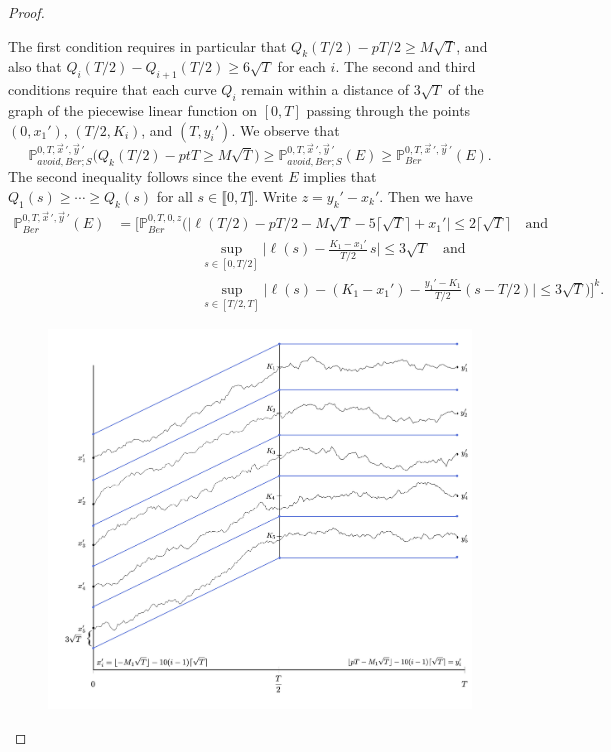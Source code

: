 \begin{proof}
\begin{enumerate}[label=(\arabic*)]
	\end{enumerate}
	The first condition requires in particular that $Q_k(T/2)-pT/2 \geq M\sqrt{T}$, and also that $Q_i(T/2)-Q_{i+1}(T/2)\geq 6\sqrt{T}$ for each $i$. The second and third conditions require that each curve $Q_i$ remain within a distance of $3\sqrt{T}$ of the graph of the piecewise linear function on $[0,T]$ passing through the points $(0,x_1')$, $(T/2,K_i)$, and $(T,y_i')$. We observe that
	\[
	\mathbb{P}^{0,T,\vec{x}\,',\vec{y}\,'}_{avoid, Ber; S} \Big(Q_k(T/2) - ptT \geq M\sqrt{T}\Big) \geq \mathbb{P}^{0,T,\vec{x}\,',\vec{y}\,'}_{avoid, Ber; S}(E) \geq \mathbb{P}^{0,T,\vec{x}\,',\vec{y}\,'}_{Ber}(E).
	\]
	The second inequality follows since the event $E$ implies that $Q_1(s)\geq\cdots\geq Q_k(s)$ for all $s\in\llbracket 0,T \rrbracket$. Write $z=y_k'-x_k'$. Then we have
	\begin{equation}\label{19gibbs}
	\begin{split}
	\mathbb{P}^{0,T,\vec{x}\,',\vec{y}\,'}_{Ber}(E) &= \Big[\mathbb{P}^{0,T,0,z}_{Ber}\Big(\big|\ell(T/2)-pT/2-M\sqrt{T}-5\lceil\sqrt{T}\rceil+x_1'\big|\leq 2\lceil\sqrt{T}\rceil \quad\mathrm{and}\\
	&\qquad\qquad\qquad \sup_{s\in[0,T/2]}\Big|\ell(s) - \frac{K_1-x_1'}{T/2}\,s\Big| \leq 3\sqrt{T}\quad\mathrm{and}\\
	&\qquad\qquad\qquad \sup_{s\in[T/2,T]}\Big|\ell(s)-(K_1-x_1')-\frac{y_1'-K_1}{T/2}(s-T/2)\Big| \leq 3\sqrt{T}\Big) \Big]^k.
	\end{split}
	\end{equation}
\begin{figure}
	\includegraphics[scale=0.6]{graphics/Lemma320.jpg}

\end{figure}
\end{proof}
